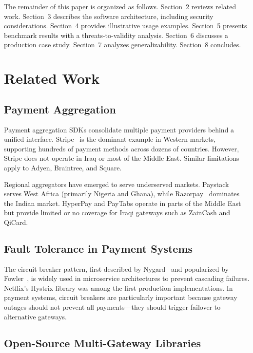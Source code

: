 \documentclass[10pt, a4paper, oneside]{article}
\begin{document}
The remainder of this paper is organized as follows. Section~2 reviews related work. Section~3 describes the software architecture, including security considerations. Section~4 provides illustrative usage examples. Section~5 presents benchmark results with a threats-to-validity analysis. Section~6 discusses a production case study. Section~7 analyzes generalizability. Section~8 concludes.


\section{Related Work}

\subsection{Payment Aggregation}

Payment aggregation SDKs consolidate multiple payment providers behind a unified interface. Stripe~\cite{stripe2023} is the dominant example in Western markets, supporting hundreds of payment methods across dozens of countries. However, Stripe does not operate in Iraq or most of the Middle East. Similar limitations apply to Adyen, Braintree, and Square.

Regional aggregators have emerged to serve underserved markets. Paystack~\cite{paystack2024} serves West Africa (primarily Nigeria and Ghana), while Razorpay~\cite{razorpay2024} dominates the Indian market. HyperPay and PayTabs operate in parts of the Middle East but provide limited or no coverage for Iraqi gateways such as ZainCash and QiCard.

\subsection{Fault Tolerance in Payment Systems}

The circuit breaker pattern, first described by Nygard~\cite{nygard2018} and popularized by Fowler~\cite{fowler2014}, is widely used in microservice architectures to prevent cascading failures. Netflix's Hystrix library was among the first production implementations. In payment systems, circuit breakers are particularly important because gateway outages should not prevent all payments---they should trigger failover to alternative gateways.

\subsection{Open-Source Multi-Gateway Libraries}
\end{document}
